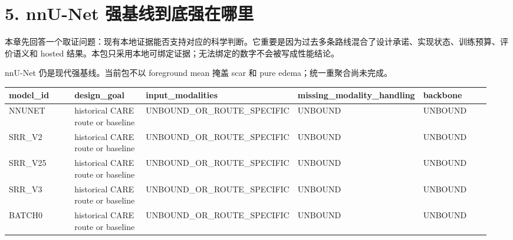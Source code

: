\section{5. nnU-Net 强基线到底强在哪里}

本章先回答一个取证问题：现有本地证据能否支持对应的科学判断。它重要是因为过去多条路线混合了设计承诺、实现状态、训练预算、评价语义和 hosted 结果。本包只采用本地可绑定证据；无法绑定的数字不会被写成性能结论。



nnU-Net 仍是现代强基线。当前包不以 foreground mean 掩盖 scar 和 pure edema；统一重聚合尚未完成。

\begin{longtable}{p{0.19\linewidth}p{0.19\linewidth}p{0.19\linewidth}p{0.19\linewidth}p{0.19\linewidth}}
\toprule
model\_id & design\_goal & input\_modalities & missing\_modality\_handling & backbone\\
\midrule
NNUNET & historical CARE route or baseline & UNBOUND\_OR\_ROUTE\_SPECIFIC & UNBOUND & UNBOUND\\
SRR\_V2 & historical CARE route or baseline & UNBOUND\_OR\_ROUTE\_SPECIFIC & UNBOUND & UNBOUND\\
SRR\_V25 & historical CARE route or baseline & UNBOUND\_OR\_ROUTE\_SPECIFIC & UNBOUND & UNBOUND\\
SRR\_V3 & historical CARE route or baseline & UNBOUND\_OR\_ROUTE\_SPECIFIC & UNBOUND & UNBOUND\\
BATCH0 & historical CARE route or baseline & UNBOUND\_OR\_ROUTE\_SPECIFIC & UNBOUND & UNBOUND\\
\bottomrule
\end{longtable}



\clearpage